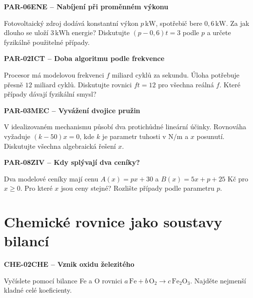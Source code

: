 \documentclass[11pt,a4paper]{article}
\begin{document}
\vspace{4mm}\par\noindent\dotfill\par\medskip
\par\medskip\noindent\textbf{PAR-06}\quad\textbf{ENE -- Nabíjení při proměnném výkonu}\par
Fotovoltaický zdroj dodává konstantní výkon $p\,\mathrm{kW}$, spotřebič bere $0{,}6\,\mathrm{kW}$. Za jak dlouho se uloží $3\,\mathrm{kWh}$ energie? Diskutujte $(p-0{,}6)t=3$ podle $p$ a určete fyzikálně použitelné případy.

\vspace{4mm}\par\noindent\dotfill\par\medskip
\par\medskip\noindent\textbf{PAR-02}\quad\textbf{ICT -- Doba algoritmu podle frekvence}\par
Procesor má modelovou frekvenci $f$ miliard cyklů za sekundu. Úloha potřebuje přesně $12$ miliard cyklů. Diskutujte rovnici $ft=12$ pro všechna reálná $f$. Které případy dávají fyzikální smysl?

\vspace{4mm}\par\noindent\dotfill\par\medskip
\par\medskip\noindent\textbf{PAR-03}\quad\textbf{MEC -- Vyvážení dvojice pružin}\par
V idealizovaném mechanismu působí dva protichůdné lineární účinky. Rovnováha vyžaduje $(k-50)x=0$, kde $k$ je parametr tuhosti v $\mathrm{N/m}$ a $x$ posunutí. Diskutujte všechna algebraická řešení $x$.

\vspace{4mm}\par\noindent\dotfill\par\medskip
\par\medskip\noindent\textbf{PAR-08}\quad\textbf{ZIV -- Kdy splývají dva ceníky?}\par
Dva modelové ceníky mají cenu $A(x)=px+30$ a $B(x)=5x+p+25$ Kč pro $x\ge0$. Pro které $x$ jsou ceny stejné? Rozlište případy podle parametru $p$.

\vspace{4mm}\par\noindent\dotfill\par\medskip

\section{Chemické rovnice jako soustavy bilancí}
\par\medskip\noindent\textbf{CHE-02}\quad\textbf{CHE -- Vznik oxidu železitého}\par
Vyčíslete pomocí bilance Fe a O rovnici $a\,\mathrm{Fe}+b\,\mathrm{O_2}\rightarrow c\,\mathrm{Fe_2O_3}$. Najděte nejmenší kladné celé koeficienty.
\end{document}
